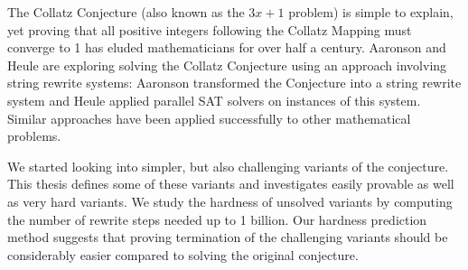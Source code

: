 \documentclass[12pt]{report}	%
\begin{document}
%
\utabstract
{}%
\indent
The Collatz Conjecture (also known as the $3x+1$ problem) is simple to explain, yet proving that all positive integers following the Collatz Mapping must converge to 1 has eluded mathematicians for over half a century. Aaronson and Heule are exploring solving the Collatz Conjecture using an approach involving string rewrite systems: Aaronson transformed the Conjecture into a string rewrite system and Heule applied parallel SAT solvers on instances of this system. Similar approaches have been applied successfully to other mathematical problems.\par
We started looking into simpler, but also challenging variants of the conjecture. This thesis defines some of these variants and investigates easily provable as well as very hard variants. We study the hardness of unsolved variants by computing the number of rewrite steps needed up to 1 billion. Our hardness prediction method suggests that proving termination of the challenging variants should be considerably easier compared to solving the original conjecture.
\tableofcontents   %

\listoffigures     %



%
%

\end{document}
